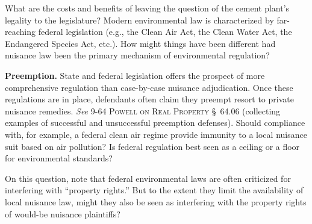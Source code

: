 
\item What are the costs and benefits of leaving the question of the cement
plant's legality to the legislature? Modern environmental law is characterized
by far-reaching federal legislation (e.g., the Clean Air Act, the Clean Water
Act, the Endangered Species Act, etc.). How might things have been different had
nuisance law been the primary mechanism of environmental regulation? 

\item \textbf{Preemption.} State and federal legislation offers the prospect of
more comprehensive regulation than case-by-case nuisance adjudication. Once
these regulations are in place, defendants often claim they preempt resort to
private nuisance remedies. \textit{See} 9-64 \textsc{Powell on Real Property}
\S~64.06 (collecting examples of successful and unsuccessful preemption
defenses). Should compliance with, for example, a federal clean air regime
provide immunity to a local nuisance suit based on air pollution? Is federal
regulation best seen as a ceiling or a floor for environmental standards? 


On this question, note that federal environmental laws are often criticized for
interfering with ``property rights.'' But to the extent they limit the
availability of local nuisance law, might they also be seen as interfering with
the property rights of would-be nuisance plaintiffs?

